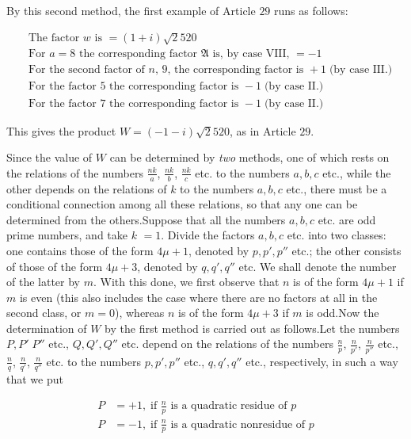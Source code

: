 By this second method, the first example of Article $29$ runs as follows:

{\small
\[
\begin{aligned}
&\text{The factor }w\text{ is }=(1+i)\surd2520\\
&\text{For }a=8\text{ the corresponding factor }\mathfrak A\text{ is, by case VIII, }=-1\\
&\text{For the second factor of }n\text{, }9\text{, the corresponding factor is }+1\;\text{(by case III.)}\\
&\text{For the factor }5\text{ the corresponding factor is }-1\;\text{(by case II.)}\\
&\text{For the factor }7\text{ the corresponding factor is }-1\;\text{(by case II.)}
\end{aligned}
\]
}

This gives the product $W=(-1-i)\surd2520$, as in Article $29$.


Since the value of $W$ can be determined by \textit{two} methods, one of which rests on the relations of the numbers $\frac{nk}{a}$, $\frac{nk}{b}$, $\frac{nk}{c}$ etc. to the numbers $a,b,c$ etc., while the other depends on the relations of $k$ to the numbers $a,b,c$ etc., there must be a conditional connection among all these relations, so that any one can be determined from the others.\quad Suppose that all the numbers $a,b,c$ etc. are odd prime numbers, and take $k$ $=1$. Divide the factors $a,b,c$ etc. into two classes: one contains those of the form $4\mu+1$, denoted by $p,p',p''$ etc.; the other consists of those of the form $4\mu+3$, denoted by $q,q',q''$ etc. We shall denote the number of the latter by $m$. With this done, we first observe that $n$ is of the form $4\mu+1$ if $m$ is even (this also includes the case where there are no factors at all in the second class, or $m=0$), whereas $n$ is of the form $4\mu+3$ if $m$ is odd.\quad Now the determination of $W$ by the first method is carried out as follows.\quad Let the numbers $P,P'\;P''$ etc., $Q,Q',Q''$ etc. depend on the relations of the numbers $\frac{n}{p}$, $\frac{n}{p'}$, $\frac{n}{p''}$ etc., $\frac{n}{q}$, $\frac{n}{q'}$, $\frac{n}{q''}$ etc. to the numbers $p,p',p''$ etc., $q,q',q''$ etc., respectively, in such a way that we put

\[
\begin{aligned}
P&=+1,\;\text{if }\frac{n}{p}\text{ is a quadratic residue of }p\\
P&=-1,\;\text{if }\frac{n}{p}\text{ is a quadratic nonresidue of }p
\end{aligned}
\]

